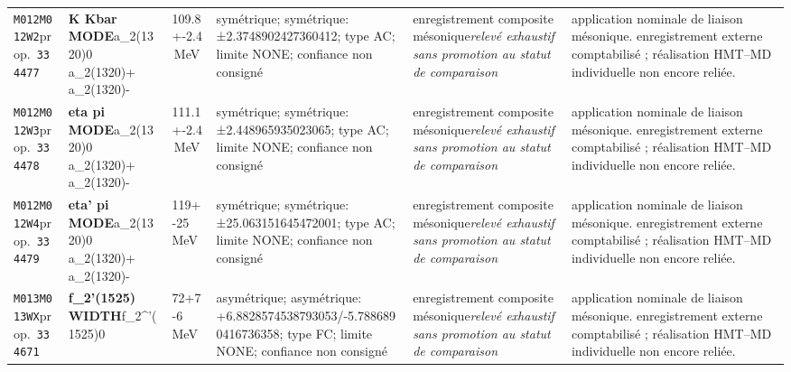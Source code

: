\begin{landscape}
\begin{longtable}{L{1.85cm}L{4.45cm}L{2.35cm}L{4.05cm}L{3.35cm}L{7.15cm}}
\texttt{M012}\newline \texttt{M012W2}\newline prop.\ \texttt{334477} & \textbf{K Kbar MODE}\newline a\_\allowbreak{}2(1320)0 \textbar{}\allowbreak{} a\_\allowbreak{}2(1320)+ \textbar{}\allowbreak{} a\_\allowbreak{}2(1320)- & 109.8+-2.4\,MeV & symétrique; symétrique: ±2.3748902427360412; type AC; limite NONE; confiance non consigné & enregistrement composite mésonique\newline \emph{relevé exhaustif sans promotion au statut de comparaison} & application nominale de liaison mésonique. enregistrement externe comptabilisé ; réalisation HMT--MD individuelle non encore reliée. \\
\texttt{M012}\newline \texttt{M012W3}\newline prop.\ \texttt{334478} & \textbf{eta pi MODE}\newline a\_\allowbreak{}2(1320)0 \textbar{}\allowbreak{} a\_\allowbreak{}2(1320)+ \textbar{}\allowbreak{} a\_\allowbreak{}2(1320)- & 111.1+-2.4\,MeV & symétrique; symétrique: ±2.448965935023065; type AC; limite NONE; confiance non consigné & enregistrement composite mésonique\newline \emph{relevé exhaustif sans promotion au statut de comparaison} & application nominale de liaison mésonique. enregistrement externe comptabilisé ; réalisation HMT--MD individuelle non encore reliée. \\
\texttt{M012}\newline \texttt{M012W4}\newline prop.\ \texttt{334479} & \textbf{eta' pi MODE}\newline a\_\allowbreak{}2(1320)0 \textbar{}\allowbreak{} a\_\allowbreak{}2(1320)+ \textbar{}\allowbreak{} a\_\allowbreak{}2(1320)- & 119+-25\,MeV & symétrique; symétrique: ±25.063151645472001; type AC; limite NONE; confiance non consigné & enregistrement composite mésonique\newline \emph{relevé exhaustif sans promotion au statut de comparaison} & application nominale de liaison mésonique. enregistrement externe comptabilisé ; réalisation HMT--MD individuelle non encore reliée. \\
\texttt{M013}\newline \texttt{M013WX}\newline prop.\ \texttt{334671} & \textbf{f\_\allowbreak{}2'(1525) WIDTH}\newline f\_\allowbreak{}2\textasciicircum{}'(1525)0 & 72+7-6\,MeV & asymétrique; asymétrique: +6.8828574538793053/-5.7886890416736358; type FC; limite NONE; confiance non consigné & enregistrement composite mésonique\newline \emph{relevé exhaustif sans promotion au statut de comparaison} & application nominale de liaison mésonique. enregistrement externe comptabilisé ; réalisation HMT--MD individuelle non encore reliée. \\

\end{longtable}
\end{landscape}
